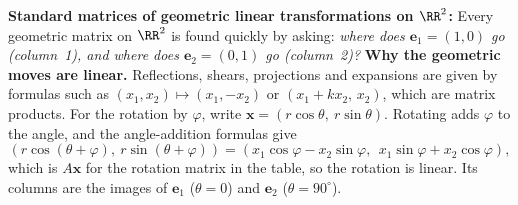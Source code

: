 \documentclass[10pt]{scrartcl}
\newcommand{\vv}[1]{\mathbf{#1}}
\begin{document}
\begin{itemize}
  \ii \textbf{Standard matrices of geometric linear transformations on $\RR^2$:} Every geometric matrix on $\RR^2$ is found quickly by asking: \emph{where does $\vv e_1=(1,0)$ go (column~1), and where does $\vv e_2=(0,1)$ go (column~2)?}
  \ii \textbf{Why the geometric moves are linear.} Reflections, shears, projections and expansions are given by formulas such as $(x_1,x_2)\mapsto(x_1,-x_2)$ or $(x_1+kx_2,\,x_2)$, which are matrix products. For the rotation by $\varphi$, write $\vv x=(r\cos\theta,\ r\sin\theta)$. Rotating adds $\varphi$ to the angle, and the angle-addition formulas give
  \[
    (r\cos(\theta+\varphi),\ r\sin(\theta+\varphi))=(x_1\cos\varphi-x_2\sin\varphi,\ \ x_1\sin\varphi+x_2\cos\varphi),
  \]
  which is $A\vv x$ for the rotation matrix in the table, so the rotation is linear. Its columns are the images of $\vv e_1$ ($\theta=0$) and $\vv e_2$ ($\theta=90^\circ$).
\end{itemize}
\end{document}
